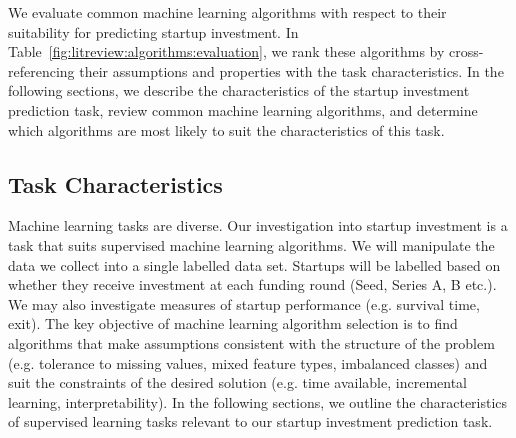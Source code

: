 \documentclass[../thesis/thesis.tex]{subfiles}
\begin{document}
\begin{refsection}
We evaluate common machine learning algorithms with respect to their suitability for predicting startup investment. In Table~\ref{fig:litreview:algorithms:evaluation}, we rank these algorithms by cross-referencing their assumptions and properties with the task characteristics. In the following sections, we describe the characteristics of the startup investment prediction task, review common machine learning algorithms, and determine which algorithms are most likely to suit the characteristics of this task.


\subsection{Task Characteristics}

Machine learning tasks are diverse. Our investigation into startup investment is a task that suits supervised machine learning algorithms. We will manipulate the data we collect into a single labelled data set. Startups will be labelled based on whether they receive investment at each funding round (Seed, Series A, B etc.). We may also investigate measures of startup performance (e.g. survival time, exit). The key objective of machine learning algorithm selection is to find algorithms that make assumptions consistent with the structure of the problem (e.g. tolerance to missing values, mixed feature types, imbalanced classes) and suit the constraints of the desired solution (e.g. time available, incremental learning, interpretability). In the following sections, we outline the characteristics of supervised learning tasks relevant to our startup investment prediction task.


\end{refsection}
\end{document}
